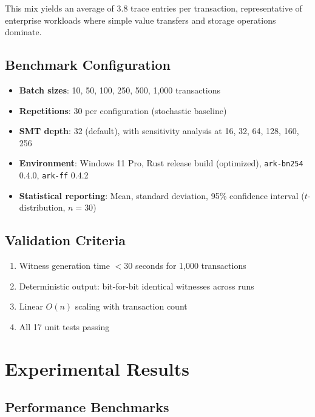 \documentclass[conference]{IEEEtran}
\begin{document}
This mix yields an average of 3.8 trace entries per transaction,
representative of enterprise workloads where simple value transfers
and storage operations dominate.

\subsection{Benchmark Configuration}

\begin{itemize}
\item \textbf{Batch sizes}: 10, 50, 100, 250, 500, 1{,}000 transactions
\item \textbf{Repetitions}: 30 per configuration (stochastic baseline)
\item \textbf{SMT depth}: 32 (default), with sensitivity analysis at
      16, 32, 64, 128, 160, 256
\item \textbf{Environment}: Windows 11 Pro, Rust release build
      (optimized), \texttt{ark-bn254} 0.4.0, \texttt{ark-ff} 0.4.2
\item \textbf{Statistical reporting}: Mean, standard deviation, 95\%
      confidence interval ($t$-distribution, $n=30$)
\end{itemize}

\subsection{Validation Criteria}

\begin{enumerate}
\item Witness generation time $< 30$ seconds for 1{,}000 transactions
\item Deterministic output: bit-for-bit identical witnesses across runs
\item Linear $O(n)$ scaling with transaction count
\item All 17 unit tests passing
\end{enumerate}

\section{Experimental Results}
\label{sec:results}

\subsection{Performance Benchmarks}
\end{document}
